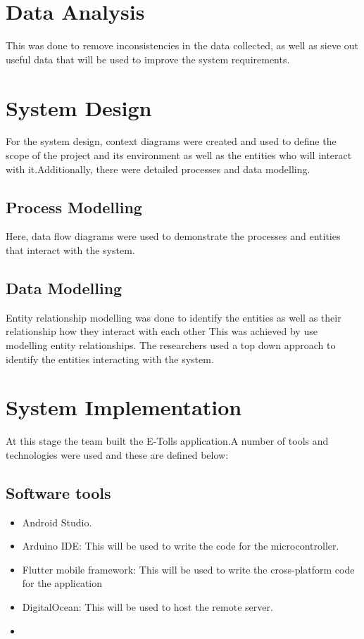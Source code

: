 \section{Data Analysis}
This was done to remove inconsistencies in the data collected, as well as sieve out useful data that will be used to improve the system requirements.


\section{System Design}
For the system design, context diagrams were created and used to define the scope of the project and its environment as well as the entities who will interact with it.Additionally, there were detailed processes and data modelling\cite{rumbaugh_object-oriented_1991}.

\subsection{Process Modelling}
Here, data flow diagrams were used to demonstrate the processes and entities that interact with the system.

\subsection{Data Modelling}
Entity relationship modelling was done to identify the entities as well as their relationship how they interact with each other
This was achieved by use modelling entity relationships. The researchers used a top down approach to identify the entities interacting with the system.


\section{System Implementation}
At this stage the team built the E-Tolls application.A number of tools and technologies were used and these are defined below:

\subsection{Software tools}
\begin{itemize}
    \item  Android Studio.
    \item Arduino IDE: This will be used to write the code for the microcontroller.
    \item Flutter mobile framework: This will be used to write the cross-platform code for the application
    \item DigitalOcean: This will be used to host the remote server.
    \item
\end{itemize}

